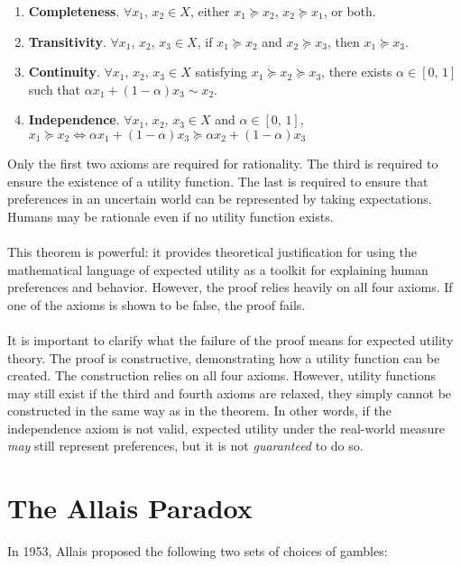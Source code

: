 \documentclass{article}
\begin{document}
\begin{enumerate}
	\item \textbf{Completeness}.  \(\forall x_1, \, x_2 \in X\), either \(x_1 \succeq  x_2\), \(x_2 \succeq  x_1\), or both.
	\item \textbf{Transitivity}.  \(\forall x_1, \, x_2,\, x_3 \in X\), if \(x_1 \succeq  x_2\) and \(x_2 \succeq  x_3\), then \(x_1 \succeq  x_3\).
	\item \textbf{Continuity}.  \(\forall x_1, \, x_2,\,x_3 \in X\) satisfying \(x_1 \succeq  x_2 \succeq  x_3\), there exists \(\alpha \in [0,\,1]\) such that \(\alpha x_1+(1-\alpha) x_3 \sim x_2\).
	\item \textbf{Independence}.  \(\forall x_1, \, x_2,\,x_3 \in X\) and \(\alpha \in [0,\,1]\), \(x_1 \succeq  x_2 \Leftrightarrow \alpha x_1+(1-\alpha)x_3 \succeq  \alpha x_2 +(1-\alpha)x_3\)
\end{enumerate}

Only the first two axioms are required for rationality.  The third is required to ensure the existence of a utility function.  The last is required to ensure that preferences in an uncertain world can be represented by taking expectations.  Humans may be rationale even if no utility function exists.  
\\
\\
This theorem is powerful: it provides theoretical justification for using the mathematical language of expected utility as a toolkit for explaining human preferences and behavior.  However, the proof relies heavily on all four axioms.  If one of the axioms is shown to be false, the proof fails.  
\\
\\
It is important to clarify what the failure of the proof means for expected utility theory. The proof is constructive, demonstrating how a utility function can be created.  The construction relies on all four axioms.  However, utility functions may still exist if the third and fourth axioms are relaxed, they simply cannot be constructed in the same way as in the theorem.  In other words, if the independence axiom is not valid, expected utility under the real-world measure \emph{may} still represent preferences, but it is not \emph{guaranteed} to do so.  
 

\section{The Allais Paradox} 

In 1953, Allais proposed the following two sets of choices of gambles:
\end{document}
